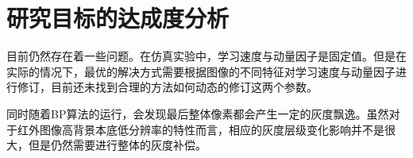 \documentclass{article}
\begin{document}
\newpage

\section{研究目标的达成度分析}%
\label{sec:研究目标的达成度分析}

目前仍然存在着一些问题。在仿真实验中，学习速度与动量因子是固定值。但是在实际的情况下，最优的解决方式需要根据图像的不同特征对学习速度与动量因子进行修订，目前还未找到合理的方法如何动态的修订这两个参数。

同时随着BP算法的运行，会发现最后整体像素都会产生一定的灰度飘逸。虽然对于红外图像高背景本底低分辨率的特性而言，相应的灰度层级变化影响并不是很大，但是仍然需要进行整体的灰度补偿。
\end{document}
